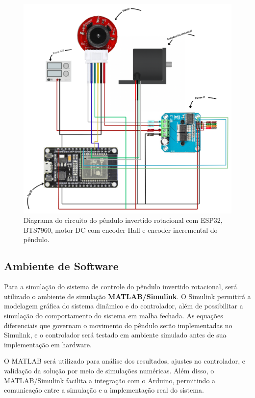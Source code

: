 \documentclass[9pt,a4paper,twocolumn,twoside]{tau-class/tau}
\begin{document}
    \begin{figure}[H]
        \centering
        \includegraphics[width=0.9\columnwidth]{figures/circuito.png}
        \caption{Diagrama do circuito do pêndulo invertido rotacional com ESP32, BTS7960, motor DC com encoder Hall e encoder incremental do pêndulo.}
        \label{fig:circuito}
    \end{figure}


\subsection{Ambiente de Software}

    Para a simulação do sistema de controle do pêndulo invertido rotacional, será utilizado o ambiente de simulação \textbf{MATLAB/Simulink}. O Simulink permitirá a modelagem gráfica do sistema dinâmico e do controlador, além de possibilitar a simulação do comportamento do sistema em malha fechada. As equações diferenciais que governam o movimento do pêndulo serão implementadas no Simulink, e o controlador será testado em ambiente simulado antes de sua implementação em hardware.

    O MATLAB será utilizado para análise dos resultados, ajustes no controlador, e validação da solução por meio de simulações numéricas. Além disso, o MATLAB/Simulink facilita a integração com o Arduino, permitindo a comunicação entre a simulação e a implementação real do sistema.
\end{document}
